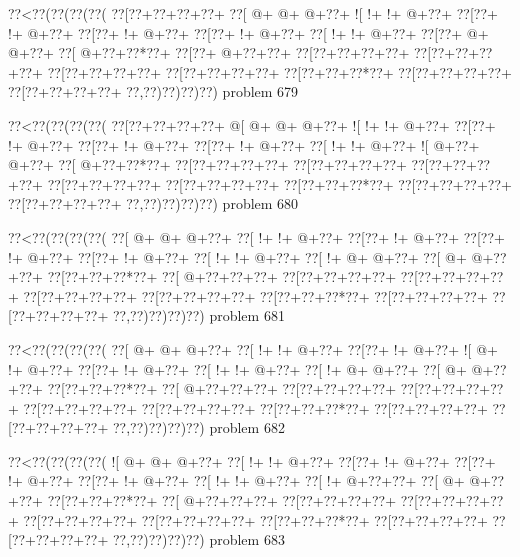 \vbox{\vbox{\goo
\0??<\0??(\0??(\0??(\0??(
\0??[\0??+\0??+\0??+\0??+
\0??[\- @+\- @+\- @+\0??+
\- ![\- !+\- !+\- @+\0??+
\0??[\0??+\- !+\- @+\0??+
\0??[\0??+\- !+\- @+\0??+
\0??[\0??+\- !+\- @+\0??+
\0??[\- !+\- !+\- @+\0??+
\0??[\0??+\- @+\- @+\0??+
\0??[\- @+\0??+\0??*\0??+
\0??[\0??+\- @+\0??+\0??+
\0??[\0??+\0??+\0??+\0??+
\0??[\0??+\0??+\0??+\0??+
\0??[\0??+\0??+\0??+\0??+
\0??[\0??+\0??+\0??+\0??+
\0??[\0??+\0??+\0??*\0??+
\0??[\0??+\0??+\0??+\0??+
\0??[\0??+\0??+\0??+\0??+
\0??,\0??)\0??)\0??)\0??)
}
\hfil problem 679\hfil\break
}

\vbox{\vbox{\goo
\0??<\0??(\0??(\0??(\0??(
\0??[\0??+\0??+\0??+\0??+
\- @[\- @+\- @+\- @+\0??+
\- ![\- !+\- !+\- @+\0??+
\0??[\0??+\- !+\- @+\0??+
\0??[\0??+\- !+\- @+\0??+
\0??[\0??+\- !+\- @+\0??+
\0??[\- !+\- !+\- @+\0??+
\- ![\- @+\0??+\- @+\0??+
\0??[\- @+\0??+\0??*\0??+
\0??[\0??+\0??+\0??+\0??+
\0??[\0??+\0??+\0??+\0??+
\0??[\0??+\0??+\0??+\0??+
\0??[\0??+\0??+\0??+\0??+
\0??[\0??+\0??+\0??+\0??+
\0??[\0??+\0??+\0??*\0??+
\0??[\0??+\0??+\0??+\0??+
\0??[\0??+\0??+\0??+\0??+
\0??,\0??)\0??)\0??)\0??)
}
\hfil problem 680\hfil\break
}

\vbox{\vbox{\goo
\0??<\0??(\0??(\0??(\0??(
\0??[\- @+\- @+\- @+\0??+
\0??[\- !+\- !+\- @+\0??+
\0??[\0??+\- !+\- @+\0??+
\0??[\0??+\- !+\- @+\0??+
\0??[\0??+\- !+\- @+\0??+
\0??[\- !+\- !+\- @+\0??+
\0??[\- !+\- @+\- @+\0??+
\0??[\- @+\- @+\0??+\0??+
\0??[\0??+\0??+\0??*\0??+
\0??[\- @+\0??+\0??+\0??+
\0??[\0??+\0??+\0??+\0??+
\0??[\0??+\0??+\0??+\0??+
\0??[\0??+\0??+\0??+\0??+
\0??[\0??+\0??+\0??+\0??+
\0??[\0??+\0??+\0??*\0??+
\0??[\0??+\0??+\0??+\0??+
\0??[\0??+\0??+\0??+\0??+
\0??,\0??)\0??)\0??)\0??)
}
\hfil problem 681\hfil\break
}

\vbox{\vbox{\goo
\0??<\0??(\0??(\0??(\0??(
\0??[\- @+\- @+\- @+\0??+
\0??[\- !+\- !+\- @+\0??+
\0??[\0??+\- !+\- @+\0??+
\- ![\- @+\- !+\- @+\0??+
\0??[\0??+\- !+\- @+\0??+
\0??[\- !+\- !+\- @+\0??+
\0??[\- !+\- @+\- @+\0??+
\0??[\- @+\- @+\0??+\0??+
\0??[\0??+\0??+\0??*\0??+
\0??[\- @+\0??+\0??+\0??+
\0??[\0??+\0??+\0??+\0??+
\0??[\0??+\0??+\0??+\0??+
\0??[\0??+\0??+\0??+\0??+
\0??[\0??+\0??+\0??+\0??+
\0??[\0??+\0??+\0??*\0??+
\0??[\0??+\0??+\0??+\0??+
\0??[\0??+\0??+\0??+\0??+
\0??,\0??)\0??)\0??)\0??)
}
\hfil problem 682\hfil\break
}

\vbox{\vbox{\goo
\0??<\0??(\0??(\0??(\0??(
\- ![\- @+\- @+\- @+\0??+
\0??[\- !+\- !+\- @+\0??+
\0??[\0??+\- !+\- @+\0??+
\0??[\0??+\- !+\- @+\0??+
\0??[\0??+\- !+\- @+\0??+
\0??[\- !+\- !+\- @+\0??+
\0??[\- !+\- @+\0??+\0??+
\0??[\- @+\- @+\0??+\0??+
\0??[\0??+\0??+\0??*\0??+
\0??[\- @+\0??+\0??+\0??+
\0??[\0??+\0??+\0??+\0??+
\0??[\0??+\0??+\0??+\0??+
\0??[\0??+\0??+\0??+\0??+
\0??[\0??+\0??+\0??+\0??+
\0??[\0??+\0??+\0??*\0??+
\0??[\0??+\0??+\0??+\0??+
\0??[\0??+\0??+\0??+\0??+
\0??,\0??)\0??)\0??)\0??)
}
\hfil problem 683\hfil\break
}

